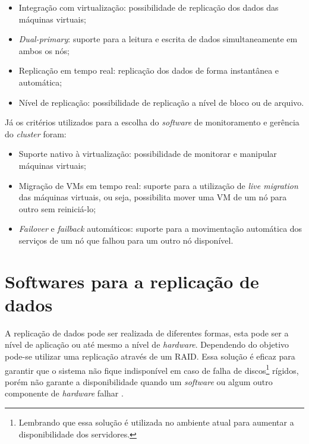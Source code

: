 \begin{itemize}
 \item Integração com virtualização: possibilidade de replicação dos dados das máquinas virtuais;
 \item \textit{Dual-primary}: suporte para a leitura e escrita de dados simultaneamente em ambos os nós;
 \item Replicação em tempo real: replicação dos dados de forma instantânea e automática;
 \item Nível de replicação: possibilidade de replicação a nível de bloco ou de arquivo.
\end{itemize}

Já os critérios utilizados para a escolha do \textit{software} de monitoramento e gerência do \textit{cluster} foram:
\begin{itemize}
 \item Suporte nativo à virtualização: possibilidade de monitorar e manipular máquinas virtuais;
 \item Migração de \acp{VM} em tempo real: suporte para a utilização de \textit{live migration} das máquinas virtuais, ou seja, possibilita mover 
 uma \ac{VM} de um nó para outro sem reiniciá-lo;
 \item \textit{Failover} e \textit{failback} automáticos: suporte para a movimentação automática dos serviços de um nó que falhou para um outro 
 nó disponível.
\end{itemize}

\section{Softwares para a replicação de dados}
\label{section:toolrepl}

A replicação de dados pode ser realizada de diferentes formas, esta pode ser a nível de aplicação ou até mesmo a nível de \textit{hardware}.
Dependendo do objetivo pode-se utilizar uma replicação através de um \ac{RAID}. Essa solução é eficaz para garantir que o sistema não fique 
indisponível em caso de falha de discos\footnote[1]{Lembrando que essa solução é utilizada no ambiente atual para 
aumentar a disponibilidade dos servidores.} rígidos, porém não garante a disponibilidade quando um \textit{software} ou algum outro componente de 
\textit{hardware} falhar \cite{zaminhani2008}.

